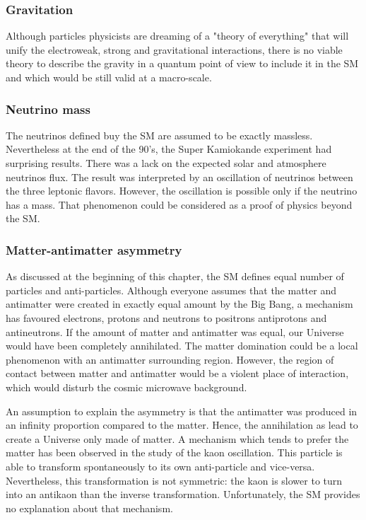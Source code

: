     \subsubsection{Gravitation}

    Although particles physicists are dreaming of a "theory of everything" that will unify the electroweak, strong and gravitational interactions,
    there is no viable theory to describe the gravity in a quantum point of view to include it in the \acrshort{SM} and which would be still valid at a macro-scale.

    \subsubsection{Neutrino mass}

    The neutrinos defined buy the \acrshort{SM} are assumed to be exactly massless.
    Nevertheless at the end of the 90's, the Super Kamiokande experiment had surprising results.
    There was a lack on the expected solar and atmosphere neutrinos flux. 
    The result was interpreted by an oscillation of neutrinos between the three leptonic flavors.
    However, the oscillation is possible only if the neutrino has a mass.
    That phenomenon could be considered as a proof of physics beyond the \acrshort{SM}.

    \subsubsection{Matter-antimatter asymmetry}

    As discussed at the beginning of this chapter, the \acrshort{SM} defines equal number of particles and anti-particles. 
    Although everyone assumes that the matter and antimatter were created in exactly equal amount by the Big Bang, a mechanism has favoured electrons, protons and neutrons to positrons antiprotons and antineutrons.
    If the amount of matter and antimatter was equal, our Universe would have been completely annihilated.
    The matter domination could be a local phenomenon with an antimatter surrounding region. 
    However, the region of contact between matter and antimatter would be a violent place of interaction, which would disturb the cosmic microwave background.

    An assumption to explain the asymmetry is that the antimatter was produced in an infinity proportion compared to the matter.
    Hence, the annihilation as lead to create a Universe only made of matter.
    A mechanism which tends to prefer the matter has been observed in the study of the kaon oscillation.
    This particle is able to transform spontaneously to its own anti-particle and vice-versa.
    Nevertheless, this transformation is not symmetric: the kaon is slower to turn into an antikaon than the inverse transformation.
    Unfortunately, the \acrshort{SM} provides no explanation about that mechanism.
 
